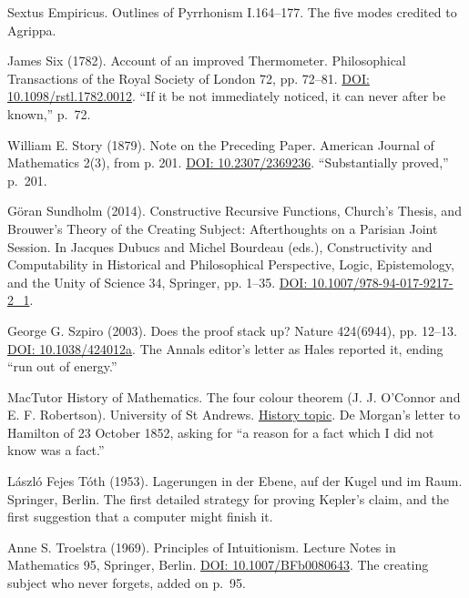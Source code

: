\noindent Sextus Empiricus. Outlines of Pyrrhonism I.164--177. The five modes credited to Agrippa.
\par\medskip

\noindent James Six (1782). Account of an improved Thermometer. Philosophical Transactions of the Royal Society of London 72, pp. 72--81. \href{https://doi.org/10.1098/rstl.1782.0012}{DOI: 10.1098/rstl.1782.0012}. ``If it be not immediately noticed, it can never after be known,'' p.~72.
\par\medskip

\noindent William E. Story (1879). Note on the Preceding Paper. American Journal of Mathematics 2(3), from p. 201. \href{https://doi.org/10.2307/2369236}{DOI: 10.2307/2369236}. ``Substantially proved,'' p.~201.
\par\medskip

\noindent G\"oran Sundholm (2014). Constructive Recursive Functions, Church's Thesis, and Brouwer's Theory of the Creating Subject: Afterthoughts on a Parisian Joint Session. In Jacques Dubucs and Michel Bourdeau (eds.), Constructivity and Computability in Historical and Philosophical Perspective, Logic, Epistemology, and the Unity of Science 34, Springer, pp. 1--35. \href{https://doi.org/10.1007/978-94-017-9217-2_1}{DOI: 10.1007/978-94-017-9217-2\_1}.
\par\medskip

\noindent George G. Szpiro (2003). Does the proof stack up? Nature 424(6944), pp. 12--13. \href{https://doi.org/10.1038/424012a}{DOI: 10.1038/424012a}. The Annals editor's letter as Hales reported it, ending ``run out of energy.''
\par\medskip

\noindent MacTutor History of Mathematics. The four colour theorem (J. J. O'Connor and E. F. Robertson). University of St Andrews. \href{https://mathshistory.st-andrews.ac.uk/HistTopics/The_four_colour_theorem/}{History topic}. De Morgan's letter to Hamilton of 23 October 1852, asking for ``a reason for a fact which I did not know was a fact.''
\par\medskip

\noindent L\'aszl\'o Fejes T\'oth (1953). Lagerungen in der Ebene, auf der Kugel und im Raum. Springer, Berlin. The first detailed strategy for proving Kepler's claim, and the first suggestion that a computer might finish it.
\par\medskip

\noindent Anne S. Troelstra (1969). Principles of Intuitionism. Lecture Notes in Mathematics 95, Springer, Berlin. \href{https://doi.org/10.1007/BFb0080643}{DOI: 10.1007/BFb0080643}. The creating subject who never forgets, added on p.~95.
\par\medskip

